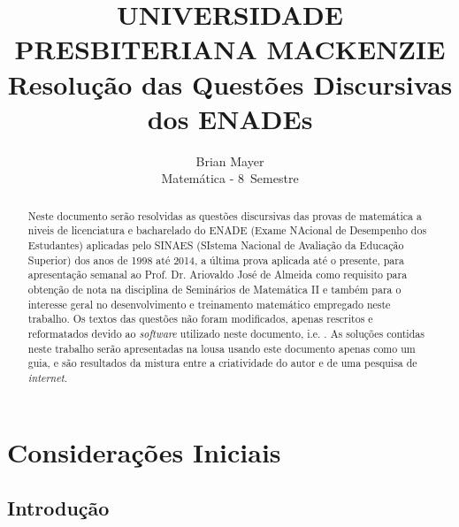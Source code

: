 \documentclass{report}
\title{\Large{\color{red} UNIVERSIDADE PRESBITERIANA MACKENZIE} \\[30pt]
\color{blue} Resolu\c c\~ao das Quest\~oes Discursivas dos ENADEs}
\author{\sc Brian Mayer\\[10pt]
\color{red} Matem\'atica - 8\textordmasculine\ Semestre}
\begin{document}
\maketitle

\begin{abstract}

Neste documento ser\~ao resolvidas as quest\~oes discursivas das provas de matem\'atica a niveis de licenciatura e bacharelado do ENADE (Exame NAcional de Desempenho dos Estudantes) aplicadas pelo SINAES (SIstema Nacional de Avalia\c c\~ao da Educa\c c\~ao Superior) dos anos de 1998 at\'e 2014, a \'ultima prova aplicada at\'e o presente, para apresenta\c c\~ao semanal ao Prof. Dr. Ariovaldo Jos\'e de Almeida como requisito para obten\c c\~ao de nota na disciplina de Semin\'arios de Matem\'atica II e tamb\'em para o interesse geral no desenvolvimento e treinamento matem\'atico empregado neste trabalho. Os textos das quest\~oes n\~ao foram modificados, apenas rescritos e reformatados devido ao {\it software} utilizado neste documento, i.e. \LaTeXe. As solu\c c\~oes contidas neste trabalho ser\~ao apresentadas na lousa usando este documento apenas como um guia, e s\~ao resultados da mistura entre a criatividade do autor e de uma pesquisa de {\it internet}. 

\end{abstract}

\tableofcontents

\part{Considera\c c\~oes Iniciais}

\chapter{Introdu\c c\~ao}
\end{document}
